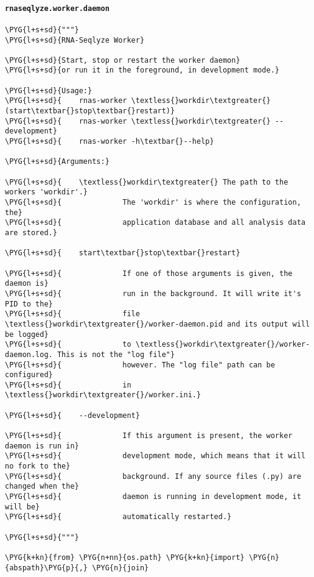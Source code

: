 \paragraph{\texttt{rnaseqlyze.worker.daemon}}
\label{index-pdf4:rnaseqlyze-worker-daemon}
\begin{Verbatim}[commandchars=\\\{\}]
\PYG{l+s+sd}{"""}
\PYG{l+s+sd}{RNA-Seqlyze Worker}

\PYG{l+s+sd}{Start, stop or restart the worker daemon}
\PYG{l+s+sd}{or run it in the foreground, in development mode.}

\PYG{l+s+sd}{Usage:}
\PYG{l+s+sd}{    rnas-worker \textless{}workdir\textgreater{} (start\textbar{}stop\textbar{}restart)}
\PYG{l+s+sd}{    rnas-worker \textless{}workdir\textgreater{} --development}
\PYG{l+s+sd}{    rnas-worker -h\textbar{}--help}

\PYG{l+s+sd}{Arguments:}

\PYG{l+s+sd}{    \textless{}workdir\textgreater{} The path to the workers 'workdir'.}
\PYG{l+s+sd}{              The 'workdir' is where the configuration, the}
\PYG{l+s+sd}{              application database and all analysis data are stored.}

\PYG{l+s+sd}{    start\textbar{}stop\textbar{}restart}

\PYG{l+s+sd}{              If one of those arguments is given, the daemon is}
\PYG{l+s+sd}{              run in the background. It will write it's PID to the}
\PYG{l+s+sd}{              file \textless{}workdir\textgreater{}/worker-daemon.pid and its output will be logged}
\PYG{l+s+sd}{              to \textless{}workdir\textgreater{}/worker-daemon.log. This is not the "log file"}
\PYG{l+s+sd}{              however. The "log file" path can be configured}
\PYG{l+s+sd}{              in \textless{}workdir\textgreater{}/worker.ini.}

\PYG{l+s+sd}{    --development}

\PYG{l+s+sd}{              If this argument is present, the worker daemon is run in}
\PYG{l+s+sd}{              development mode, which means that it will no fork to the}
\PYG{l+s+sd}{              background. If any source files (.py) are changed when the}
\PYG{l+s+sd}{              daemon is running in development mode, it will be}
\PYG{l+s+sd}{              automatically restarted.}

\PYG{l+s+sd}{"""}

\PYG{k+kn}{from} \PYG{n+nn}{os.path} \PYG{k+kn}{import} \PYG{n}{abspath}\PYG{p}{,} \PYG{n}{join}


\end{Verbatim}
